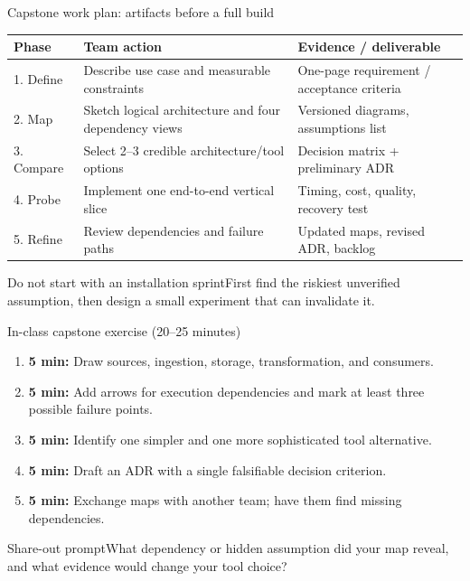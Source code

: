 \documentclass[aspectratio=43,10pt]{beamer}
\begin{document}
\begin{frame}{Capstone work plan: artifacts before a full build}
\small
\begin{tabularx}{\textwidth}{@{}p{2.1cm}X p{4.2cm}@{}}\toprule
Phase & Team action & Evidence / deliverable \\ \midrule
1. Define & Describe use case and measurable constraints & One-page requirement / acceptance criteria \\
2. Map & Sketch logical architecture and four dependency views & Versioned diagrams, assumptions list \\
3. Compare & Select 2--3 credible architecture/tool options & Decision matrix + preliminary ADR \\
4. Probe & Implement one end-to-end vertical slice & Timing, cost, quality, recovery test \\
5. Refine & Review dependencies and failure paths & Updated maps, revised ADR, backlog \\
\bottomrule\end{tabularx}
\vspace{.65em}
\begin{block}{Do not start with an installation sprint}First find the riskiest unverified assumption, then design a small experiment that can invalidate it.\end{block}
\end{frame}

\begin{frame}{In-class capstone exercise (20--25 minutes)}
\begin{enumerate}
\item \textbf{5 min:} Draw sources, ingestion, storage, transformation, and consumers.
\item \textbf{5 min:} Add arrows for execution dependencies and mark at least three possible failure points.
\item \textbf{5 min:} Identify one simpler and one more sophisticated tool alternative.
\item \textbf{5 min:} Draft an ADR with a single falsifiable decision criterion.
\item \textbf{5 min:} Exchange maps with another team; have them find missing dependencies.
\end{enumerate}
\begin{block}{Share-out prompt}What dependency or hidden assumption did your map reveal, and what evidence would change your tool choice?\end{block}
\end{frame}
\end{document}
